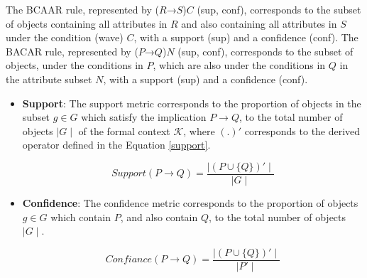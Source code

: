 \documentclass[a4paper,twoside]{article}
\begin{document}
The BCAAR rule, represented by ($R$→$S$)$C$ (sup, conf), corresponds to the subset of objects containing all attributes in $R$ and also containing all attributes in $S$ under the condition (wave) $C$, with a support (sup) and a confidence (conf). The BACAR rule, represented by ($P$→$Q$)$N$ (sup, conf), corresponds to the subset of objects, under the conditions in $P$, which are also under the conditions in $Q$ in the attribute subset $N$, with a support (sup) and a confidence (conf).

\begin{itemize}
    \item \textbf{Support}: The support metric corresponds to the proportion of objects in the subset $g \in G$ which satisfy the implication \textit{$P \rightarrow Q$}, to the total number of objects $\mid G\mid$ of the formal context $\mathcal{K}$, where $(.)'$ corresponds to the derived operator defined in the Equation \ref{support}.
 
\begin{equation}
\label{support}
Support(P \to Q) = \frac{ \mid (P \cup \{Q\})' \mid }{\mid G \mid}
\end{equation}
\end{itemize}


\begin{itemize}
    \item \textbf{Confidence}: The confidence metric corresponds to the proportion of objects $g \in G$ which contain $P$, and also contain $Q$, to the total number of objects $\mid G\mid$.

\begin{equation}
\label{confidence}
Confiance(P \to Q) = \frac{\mid(P \cup \{Q\})' \mid}{ \mid P' \mid}
\end{equation}
\end{itemize}
\end{document}
